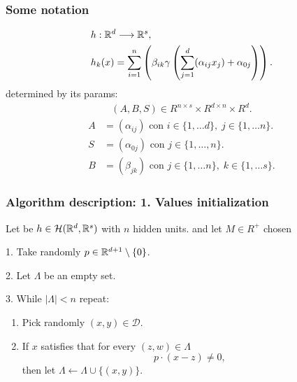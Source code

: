 \begin{frame}
    \frametitle{Some notation}
    
        \begin{align}
            &h: \mathbb{R}^d \longrightarrow \mathbb{R}^s,\\
            &h_k(x) = \sum_{i= 1}^n 
                \left(
                    \beta_{i k} 
                    \gamma
                    \left( 
                        \sum_{j = 1}^d
                        (
                            \alpha_{i j} x_j
                        ) + \alpha_{0 j}
                    \right)
                \right).
        \end{align}
        determined by its params: 
        \begin{align}
            (A,B,S) \in R^{n \times s} \times R^{d \times n} \times R^{d}.
        \end{align} 
        \begin{align*}\label{eq:representation red neuronal}
            A &= (\alpha_{i j}) \text{ con }  i \in \{1, \ldots d\}, \; j \in \{1, \ldots n\}. \\
            S &= (\alpha_{0 j}) \text{ con }  j \in \{1, \ldots, n\}. \\
            B &= (\beta_{j k}) \text{ con }  j \in \{1, \ldots n\}, \; k \in \{1, \ldots s\}.
        \end{align*}
    
\end{frame}

\begin{frame}
    \frametitle{Algorithm description: 1. Values initialization}
    Let be $h \in  \mathcal{H}(\mathbb{R}^d, \mathbb{R}^s)$
 with $n$ hidden units. 
and let $M \in R^+$ chosen

    1. Take randomly $p \in \mathbb{R}^{d+1} \setminus \{0\}$.  

    2. Let $\Lambda$ be an empty set.   

    3.  While $|\Lambda| < n$ repeat:
    \begin{enumerate}
        \item Pick randomly $(x,y) \in \mathcal{D}$.
        \item If $x$ satisfies that for every $(z,w) \in \Lambda$
        \begin{equation}
            p \cdot (x - z) \neq 0,
        \end{equation}
        then let $\Lambda \gets \Lambda \cup \{(x,y)\}$.
    \end{enumerate}
\end{frame}

